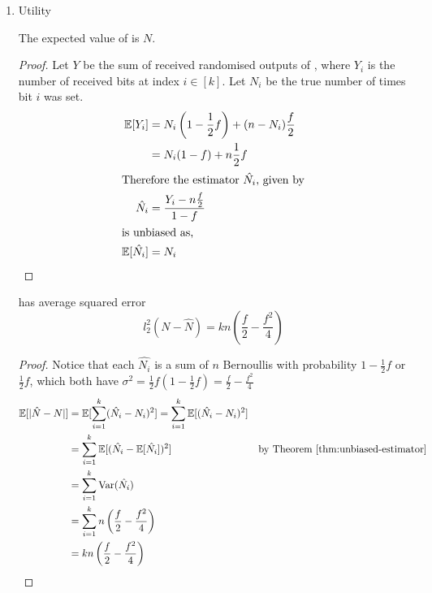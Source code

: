 \documentclass{article}
\begin{document}
\begin{enumerate}
\begin{proof}
\begin{align}
			&= \left(\frac{2-f}{f}\right)^{2m}
	\end{align}
	Therefore,
	\begin{equation}
		\varepsilon = 2m\log\left(\frac{2-f}{f}\right)
	\end{equation}
\end{proof}
\item Utility
\begin{theorem}
\label{thm:unbiased-estimator}
	The expected value of  is $N$.
\end{theorem}
\begin{proof} Let $Y$ be the sum of received randomised outputs of , where $Y_i$ is the number of received bits at index $i\in [k]$. Let $N_i$ be the true number of times bit $i$ was set.
\begin{align*}
\mathbb{E}[Y_i] &= N_i\left(1-\frac{1}{2}f\right) + (n-N_i)\frac{f}{2}\\
	&= N_i(1-f) + n\frac{1}{2}f\\
	\intertext{Therefore the estimator $\hat{N_i}$, given by}
\hat{N_i} &= \frac{Y_i-n\frac{f}{2}}{1-f}\\
\intertext{is unbiased as,}
\mathbb{E}[\hat{N_i}] &= N_i
\end{align*}
\end{proof}
\begin{theorem}
	 has average squared error
	\begin{equation}
		l_2^2(N-\hat{N}) = kn\left(\frac{f}{2}-\frac{f^2}{4}\right)
	\end{equation}
\end{theorem}
\begin{proof}\hfill
Notice that each $\hat{N_i}$ is a sum of $n$ Bernoullis with probability $1-\frac{1}{2}f$ or $\frac{1}{2}f$, which both have $\sigma^2 = \frac{1}{2}f\left(1-\frac{1}{2}f\right) = \frac{f}{2}-\frac{f^2}{4}$
	\begin{align*}
		\mathbb{E}[|\hat{N}-N|] &= \mathbb{E}[\sum\limits_{i=1}^k(\hat{N_i}-N_i)^2] = \sum\limits_{i=1}^k\mathbb{E}[(\hat{N_i}-N_i)^2] &&\\
			&= \sum\limits_{i=1}^k\mathbb{E}[(\hat{N_i}-\mathbb{E}[\hat{N_i}])^2] && \text{by Theorem~\ref{thm:unbiased-estimator}}\\
			&= \sum\limits_{i=1}^k\text{Var}(\hat{N_i}) &&\\
			&= \sum\limits_{i=1}^kn\left(\frac{f}{2}-\frac{f^2}{4}\right) &&\\
			&= kn\left(\frac{f}{2}-\frac{f^2}{4}\right)
	\end{align*}
\end{proof}
\end{enumerate}



\end{document}
